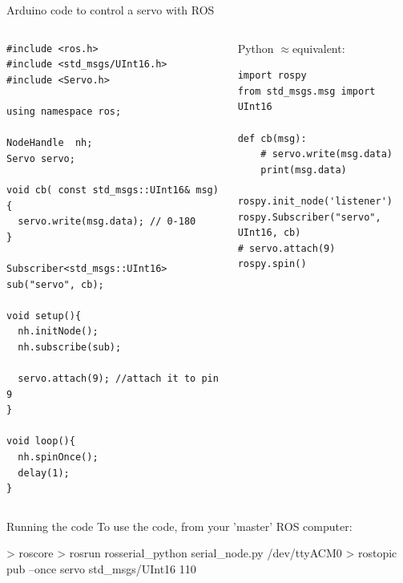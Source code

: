 \documentclass[compress]{beamer}
\begin{document}
\begin{frame}[fragile]{Arduino code to control a servo with ROS}
\begin{columns}
    \begin{column}{0.5\linewidth}
        
\begin{verbatim}
#include <ros.h>
#include <std_msgs/UInt16.h>
#include <Servo.h> 

using namespace ros;

NodeHandle  nh;
Servo servo;

void cb( const std_msgs::UInt16& msg){
  servo.write(msg.data); // 0-180
}

Subscriber<std_msgs::UInt16> sub("servo", cb);

void setup(){
  nh.initNode();
  nh.subscribe(sub);

  servo.attach(9); //attach it to pin 9
}

void loop(){
  nh.spinOnce();
  delay(1);
}
\end{verbatim}
    \end{column}
    \begin{column}{0.5\linewidth}

        \small Python $\approx$equivalent:

\begin{verbatim}
import rospy
from std_msgs.msg import UInt16

def cb(msg):
    # servo.write(msg.data)
    print(msg.data)

rospy.init_node('listener')
rospy.Subscriber("servo", UInt16, cb)
# servo.attach(9)
rospy.spin()
\end{verbatim}
    \end{column}
\end{columns}
\end{frame}

\begin{frame}[fragile]{Running the code}
    To use the code, from your 'master' ROS computer:

\begin{shcode}
> roscore
> rosrun rosserial_python serial_node.py /dev/ttyACM0
> rostopic pub --once servo std_msgs/UInt16 110
\end{shcode}
\end{frame}
\end{document}
